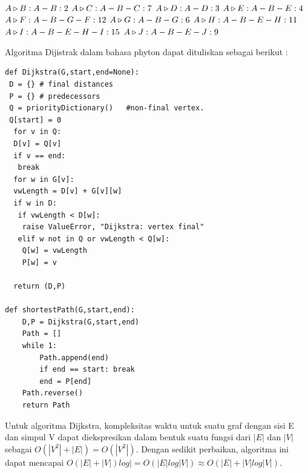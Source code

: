 \begin{enumerate}
$A \triangleright B : A - B : 2 \newline$
$A \triangleright C : A - B - C : 7 \newline$
$A \triangleright D : A - D : 3 \newline$
$A \triangleright E : A - B - E : 4 \newline$
$A \triangleright F : A - B - G - F : 12 \newline$
$A \triangleright G : A - B - G : 6 \newline$
$A \triangleright H : A - B - E - H : 11 \newline$
$A \triangleright I : A - B - E - H - I : 15 \newline$
$A \triangleright J : A - B - E - J : 9 \newline$

Algoritma Dijistrak dalam bahasa phyton dapat dituliskan sebagai berikut :

\lstset{language=Python}
\label{lst:Djistrak}
\begin{lstlisting}[frame=single]
def Dijkstra(G,start,end=None):
 D = {}	# final distances
 P = {}	# predecessors
 Q = priorityDictionary()   #non-final vertex.
 Q[start] = 0
  for v in Q:
  D[v] = Q[v]
  if v == end: 
   break
  for w in G[v]:
  vwLength = D[v] + G[v][w]
  if w in D:
   if vwLength < D[w]:
  	raise ValueError, "Dijkstra: vertex final"   
   elif w not in Q or vwLength < Q[w]:
  	Q[w] = vwLength
  	P[w] = v
		
  return (D,P)
			
def shortestPath(G,start,end):
	D,P = Dijkstra(G,start,end)
	Path = []
	while 1:
		Path.append(end)
		if end == start: break
		end = P[end]
	Path.reverse()
	return Path
\end{lstlisting}

Untuk algoritma Dijkstra, kompleksitas waktu untuk
suatu graf dengan sisi E dan simpul V dapat diekspresikan
dalam bentuk suatu fungsi dari $|E|$ dan $|V|$ sebagai $O(|V^{2}| + |E|) = O(|V^{2}|)$. Dengan sedikit perbaikan, algoritma ini dapat mencapai $O(|E| + |V|) log| =
O(|E| log|V|) ≈ O(|E| + |V| log|V|)$.
\end{enumerate}